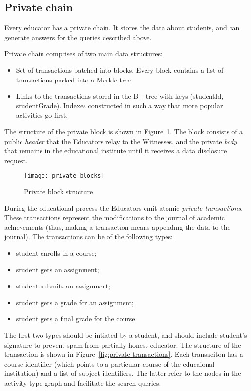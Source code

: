 \subsection{Private chain}
\label{sec:priv-chain}

Every educator has a private chain. It stores the data about students, and can
generate answers for the queries described above.

Private chain comprises of two main data structures:
\begin{itemize}
\item Set of transactions batched into blocks. Every block contains a list of
  transactions packed into a Merkle tree.
\item Links to the transactions stored in the B+-tree with keys (studentId,
  studentGrade). Indexes constructed in such a way that more popular activities
  go first.
\end{itemize}

The structure of the private block is shown in Figure~\ref{fig:privateblocks}.
The block consists of a public \textit{header} that the Educators relay to the
Witnesses, and the private \textit{body} that remains in the educational
institute until it receives a data disclosure request.

\begin{figure}[ht]
\centering
\texttt{[image: private-blocks]}
\caption{Private block structure}
\label{fig:privateblocks}
\end{figure}

During the educational process the Educators emit atomic \textit{private
  transactions}. These transactions represent the modifications to the journal of
academic achievements (thus, making a transaction means appending the data to
the journal). The transactions can be of the following types:

\begin{itemize}
\item student enrolls in a course;
\item student gets an assignment;
\item student submits an assignment;
\item student gets a grade for an assignment;
\item student gets a final grade for the course.
\end{itemize}

The first two types should be intiated by a student, and should include
student's signature to prevent spam from partially-honest educator. The
structure of the transaction is shown in Figure~\ref{fig:private-transactions}. Each transaciton has a course identifier (which points to a particular course of the educaional institution) and a list of subject identifiers. The latter refer to the nodes in the activity type graph and facilitate the search queries.

